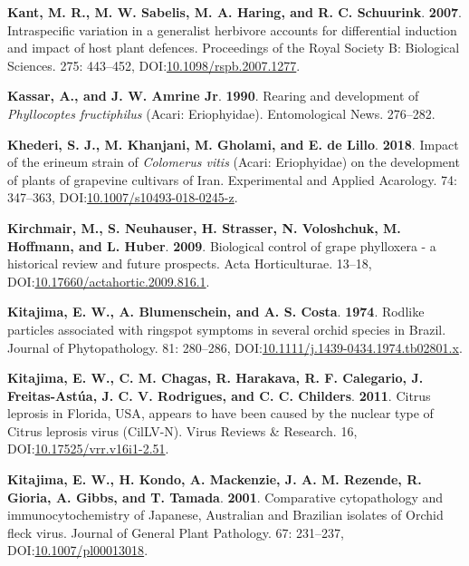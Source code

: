 \documentclass[12pt,final,CPage]{ufthesis}
\newlength{\cslhangindent}
\newenvironment{CSLReferences}[2] %
{%
	\setlength{\parindent}{0pt}
	\ifodd #1 \everypar{\setlength{\hangindent}{\cslhangindent}}\ignorespaces\fi
	\ifnum #2 > 0
	\setlength{\parskip}{#2\baselineskip}
	\fi
}%
{}
\begin{document}
{\begin{CSLReferences}{1}{0}
  \leavevmode{}%
  \textbf{Kant, M. R., M. W. Sabelis, M. A. Haring, and R. C. Schuurink}. \textbf{2007}. Intraspecific variation in a generalist herbivore accounts for differential induction and impact of host plant defences. Proceedings of the Royal Society B: Biological Sciences. 275: 443--452, DOI:\href{https://doi.org/10.1098/rspb.2007.1277}{10.1098/rspb.2007.1277}.

  \leavevmode{}%
  \textbf{Kassar, A., and J. W. Amrine Jr}. \textbf{1990}. Rearing and development of {\emph{Phyllocoptes fructiphilus}} ({Acari}: {Eriophyidae}). Entomological News. 276--282.

  \leavevmode{}%
  \textbf{Khederi, S. J., M. Khanjani, M. Gholami, and E. de Lillo}. \textbf{2018}. Impact of the erineum strain of {\emph{Colomerus vitis}} ({Acari}: {Eriophyidae}) on the development of plants of grapevine cultivars of {Iran}. Experimental and Applied Acarology. 74: 347--363, DOI:\href{https://doi.org/10.1007/s10493-018-0245-z}{10.1007/s10493-018-0245-z}.

  \leavevmode{}%
  \textbf{Kirchmair, M., S. Neuhauser, H. Strasser, N. Voloshchuk, M. Hoffmann, and L. Huber}. \textbf{2009}. Biological control of grape phylloxera - a historical review and future prospects. Acta Horticulturae. 13--18, DOI:\href{https://doi.org/10.17660/actahortic.2009.816.1}{10.17660/actahortic.2009.816.1}.

  \leavevmode{}%
  \textbf{Kitajima, E. W., A. Blumenschein, and A. S. Costa}. \textbf{1974}. Rodlike particles associated with ringspot symptoms in several orchid species in {Brazil}. Journal of Phytopathology. 81: 280--286, DOI:\href{https://doi.org/10.1111/j.1439-0434.1974.tb02801.x}{10.1111/j.1439-0434.1974.tb02801.x}.

  \leavevmode{}%
  \textbf{Kitajima, E. W., C. M. Chagas, R. Harakava, R. F. Calegario, J. Freitas-Astúa, J. C. V. Rodrigues, and C. C. Childers}. \textbf{2011}. {Citrus leprosis} in {Florida}, {USA}, appears to have been caused by the nuclear type of {Citrus leprosis virus} ({CilLV-N}). Virus Reviews {\&} Research. 16, DOI:\href{https://doi.org/10.17525/vrr.v16i1-2.51}{10.17525/vrr.v16i1-2.51}.

  \leavevmode{}%
  \textbf{Kitajima, E. W., H. Kondo, A. Mackenzie, J. A. M. Rezende, R. Gioria, A. Gibbs, and T. Tamada}. \textbf{2001}. Comparative cytopathology and immunocytochemistry of {Japanese}, {Australian} and {Brazilian} isolates of {Orchid fleck virus}. Journal of General Plant Pathology. 67: 231--237, DOI:\href{https://doi.org/10.1007/pl00013018}{10.1007/pl00013018}.


\end{CSLReferences}}
\end{document}
